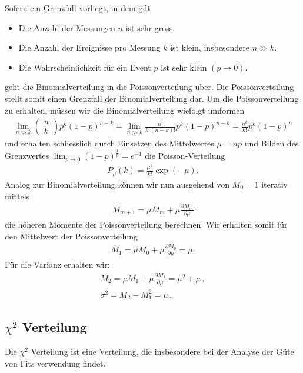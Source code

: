 Sofern ein Grenzfall vorliegt, in dem gilt
\begin{itemize}
    \setlength\itemsep{0em}
        \item Die Anzahl der Messungen $n$ ist sehr gross.
        \item Die Anzahl der Ereignisse pro Messung $k$ ist klein, insbesondere $n \gg k$.
        \item Die Wahrscheinlichkeit für ein Event $p$ ist sehr klein $(p \rightarrow 0)$.
\end{itemize}
geht die Binomialverteilung in die Poissonverteilung über. Die Poissonverteilung stellt somit einen Grenzfall der Binomialverteilung dar. Um die Poissonverteilung zu erhalten, müssen wir die Binomialverteilung wiefolgt umformen
\begin{align}
\lim_{n \gg k} \begin{pmatrix} n \\ k \end{pmatrix} p^k (1 - p)^{n - k} = \lim_{n \gg k} \frac{ n! }{ k! (n - k)! } p^k (1 - p)^{n - k} = \frac{ n^k }{ k! } p^k (1 - p)^n
\end{align}
und erhalten schliesslich durch Einsetzen des Mittelwertes $\mu = np$  und Bilden des Grenzwertes $\lim_{p \rightarrow 0} (1 - p)^{\frac{1}{p}} = e^{-1}$  die Poisson-Verteilung 
\begin{align}
P_{\mu}(k) = \frac{ \mu^k }{ k! } \exp(-\mu) . 
\end{align}
Analog zur Binomialverteilung können wir nun ausgehend von $M_0 = 1$ iterativ mittels
\begin{align}
 M_{m + 1} = \mu M_m + \mu \frac{ \partial M_m }{ \partial \mu }
\end{align}
die höheren Momente der Poissonverteilung berechnen. Wir erhalten somit für den Mittelwert der Poissonverteilung
\begin{align}
 M_1 = \mu M_0 + \mu \frac{ \partial M_0 }{ \partial \mu } = \mu.
\end{align}
Für die Varianz erhalten wir:
\begin{align}
M_2 = \mu M_1 + \mu \frac{ \partial M_1 }{ \partial \mu } = \mu^2 + \mu\,,\\
\sigma^2 =  M_2 - M_1^2 = \mu\,.
\end{align}

\subsection{$\chi^2$ Verteilung}
Die $\chi^2$ Verteilung ist eine Verteilung, die insbesondere bei der Analyse der Güte von Fits verwendung findet. 

